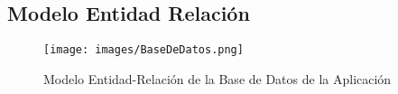 \subsection{Modelo Entidad Relación}

\begin{figure}[H]
    \texttt{[image: images/BaseDeDatos.png]}
    \centering
    \caption{Modelo Entidad-Relación de la Base de Datos de la Aplicación}
\end{figure}